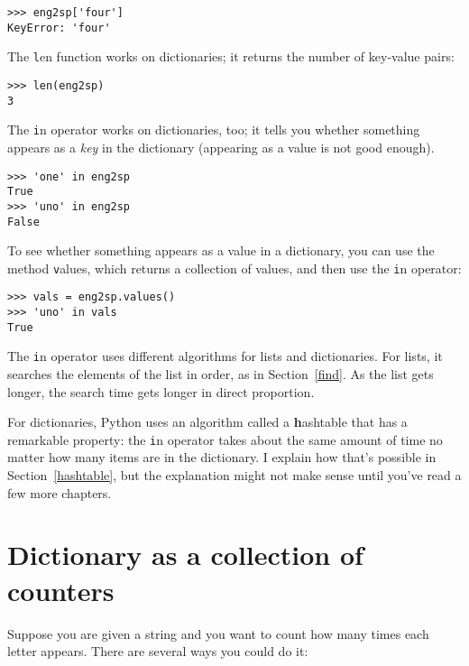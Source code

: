 \documentclass[
DIV=11,
fontsize=13,
twoside,
headinclude=false,
titlepage=firstiscover,
abstract=true,
headsepline=true,
footsepline=true,
chapterprefix=true, %
headings=big,
bibliography=totoc,%
captions=tableheading
]{scrbook}
\theoremstyle{definition}
\begin{document}
\begin{lstlisting}
>>> eng2sp['four']
KeyError: 'four'
\end{lstlisting}
%
The {\texttt len} function works on dictionaries; it returns the
number of key-value pairs:

\begin{lstlisting}
>>> len(eng2sp)
3
\end{lstlisting}
%
The {\texttt in} operator works on dictionaries, too; it tells you whether
something appears as a {\em key} in the dictionary (appearing
as a value is not good enough).

\begin{lstlisting}
>>> 'one' in eng2sp
True
>>> 'uno' in eng2sp
False
\end{lstlisting}
%
To see whether something appears as a value in a dictionary, you
can use the method {\texttt values}, which returns a collection of
values, and then use the {\texttt in} operator:

\begin{lstlisting}
>>> vals = eng2sp.values()
>>> 'uno' in vals
True
\end{lstlisting}
%
The {\texttt in} operator uses different algorithms for lists and
dictionaries.  For lists, it searches the elements of the list in
order, as in Section~\ref{find}.  As the list gets longer, the search
time gets longer in direct proportion.

For dictionaries, Python uses an
algorithm called a {\textbf hashtable} that has a remarkable property: the
{\texttt in} operator takes about the same amount of time no matter how
many items are in the dictionary.  I explain how that's possible
in Section~\ref{hashtable}, but the explanation might not make
sense until you've read a few more chapters.


\section{Dictionary as a collection of counters}
\label{histogram}

Suppose you are given a string and you want to count how many
times each letter appears.  There are several ways you could do it:
\end{document}
